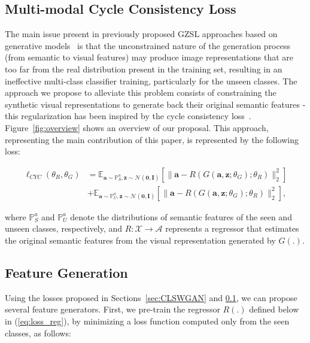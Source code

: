 \documentclass[runningheads]{llncs}
\begin{document}
\subsection{Multi-modal Cycle Consistency Loss}
\label{sec:cycle}

The main issue present in previously proposed GZSL approaches based on generative models~\cite{XianCVPR2018,long2017zero,bucher2017generating} is that the unconstrained nature of the generation process (from semantic to visual features) may produce image representations that are too far from the real distribution present in the training set, resulting in an ineffective multi-class classifier training, particularly for the unseen classes.  The approach we propose to alleviate this problem consists of constraining the synthetic visual representations to generate back their original semantic features - this regularization has been inspired by the cycle consistency loss~\cite{CycleGAN2017}.  Figure~\ref{fig:overview} shows an overview of our proposal.
This approach, representing the main contribution of this paper, is represented by the following loss:


\begin{equation}
\begin{split}
\ell_{CYC}(\theta_R,\theta_G)  & =  \mathbb E_{\mathbf{a} \sim \mathbb P_S^a,\mathbf{z} \sim \mathcal{N}(\mathbf{0},\mathbf{I})} \left [ \|{\mathbf{a} - R(G(\mathbf{a},\mathbf{z};\theta_G);\theta_R)}\|_2^2 \right ]  \\
& + \mathbb E_{\mathbf{a} \sim \mathbb P_U^a,\mathbf{z} \sim \mathcal{N}(\mathbf{0},\mathbf{I})} \left [ \|{\mathbf{a} - R(G(\mathbf{a},\mathbf{z};\theta_G);\theta_R)}\|_2^2 \right ],
\end{split}
\label{eq:cyc}
\end{equation}


where $\mathbb P_S^a$ and $\mathbb P_U^a$ denote the distributions of semantic features of the seen and unseen classes, respectively, and $R:\mathcal{X} \rightarrow \mathcal{A}$ represents a regressor that estimates the original semantic features from the visual representation generated by $G(.)$.

\subsection{Feature Generation}
\label{sec:feature}

Using the losses proposed in Sections~\ref{sec:CLSWGAN} and \ref{sec:cycle}, we can propose several feature generators.  First, we pre-train the regressor $R(.)$ defined below in (\ref{eq:loss_reg}), by minimizing a loss function computed only from the seen classes, as follows:
\end{document}
